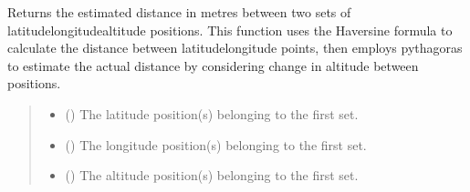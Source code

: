 \documentclass[letterpaper,10pt,english]{sphinxmanual}
\begin{document}
\begin{fulllineitems}
\label{\detokenize{modules/util/transformations:qnav.util.transformations.haversine}}
\pysigstartsignatures
{}
\pysigstopsignatures
\sphinxAtStartPar
Returns the estimated distance in metres between two sets of
latitude\sphinxhyphen{}longitude\sphinxhyphen{}altitude positions. This function uses the Haversine
formula to calculate the distance between latitude\sphinxhyphen{}longitude points, then
employs pythagoras to estimate the actual distance by considering change
in altitude between positions.
\begin{quote}\begin{description}
\begin{itemize}
\item {} 
\sphinxAtStartPar
{} (\sphinxstyleliteralemphasis{\sphinxupquote{ (}}\sphinxstyleliteralemphasis{\sphinxupquote{)}}) \textendash{} The latitude position(s) belonging to the first set.

\item {} 
\sphinxAtStartPar
{} (\sphinxstyleliteralemphasis{\sphinxupquote{ (}}\sphinxstyleliteralemphasis{\sphinxupquote{)}}) \textendash{} The longitude position(s) belonging to the first set.

\item {} 
\sphinxAtStartPar
{} (\sphinxstyleliteralemphasis{\sphinxupquote{ (}}\sphinxstyleliteralemphasis{\sphinxupquote{)}}) \textendash{} The altitude position(s) belonging to the first set.


\end{itemize}
\end{description}
\end{quote}
\end{fulllineitems}
\end{document}
